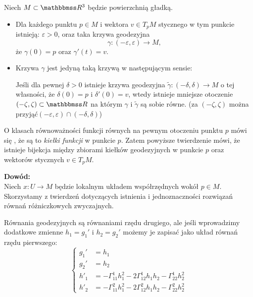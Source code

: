 \begin{frame}

\begin{twierdzenie}
Niech $M\subset \R^3$ będzie powierzchnią gładką.
\begin{itemize}
\item Dla każdego punktu $p\in M$ i wektora $v\in T_pM$ stycznego w tym punkcie istnieją: $\varepsilon>0$, oraz taka krzywa geodezyjna \[\gamma\colon(-\varepsilon,\varepsilon)\to M,\]że $\gamma(0)=p$ oraz $\gamma'(t)=v$. 
\pause \item Krzywa $\gamma$ jest jedyną taką krzywą w następującym sensie:

Jeśli dla pewnej $\delta>0$ istnieje krzywa geodezyjna $\widetilde{{\gamma}}\colon (-\delta,\delta)\to M$ o tej własności, że $\delta(0)=p$ i $\delta'(0)=v$, wtedy istnieje mniejsze otoczenie $(-\zeta,\zeta)\subset \R$ na którym $\gamma$ i $\widetilde{\gamma}$ są sobie równe. 
\pause (za $(-\zeta,\zeta)$ można przyjąć$(-\varepsilon,\varepsilon)\cap(-\delta,\delta)$)
\end{itemize}
\end{twierdzenie}

\end{frame}
\begin{frame}


\begin{uwaga}
O klasach równoważności funkcji równych na pewnym otoczeniu punktu $p$ mówi się , że są to \textit{kiełki funkcji} w punkcie $p$. Zatem powyższe twierdzenie mówi, że istnieje bijekcja między zbiorami kiełków geodezyjnych w punkcie $p$ oraz wektorów stycznych $v\in T_pM$.
\end{uwaga}

\pause \textcolor{ared}{\textbf{Dowód:}}\\
Niech $x\colon U\to M$ będzie lokalnym układem współrzędnych wokół $p\in M$.
Skorzystamy z twierdzeń dotyczących istnienia i jednoznaczności rozwiązań równań różniczkowych zwyczajnych. 

\end{frame}
\begin{frame}

Równania geodezyjnych są równaniami rzędu drugiego, ale jeśli wprowadzimy dodatkowe zmienne $h_1=g_1'$ i $h_2=g_2'$ możemy je zapisać jako układ równań rzędu pierwszego:
\pause \begin{equation}\label{eqn:uniq-geodes}
\left\{
\begin{aligned}
g_1'&=h_1\\
g_2'&=h_2\\
h'_1&=-\Gamma^1_{11}h_1^2-2\Gamma^1_{12}h_1h_2-\Gamma^1_{22}h_2^2\\
h'_2&=-\Gamma^2_{11}h_1^2-2\Gamma^2_{12}h_1h_2-\Gamma^2_{22}h_2^2
\end{aligned}
\right.
\end{equation}


\end{frame}
